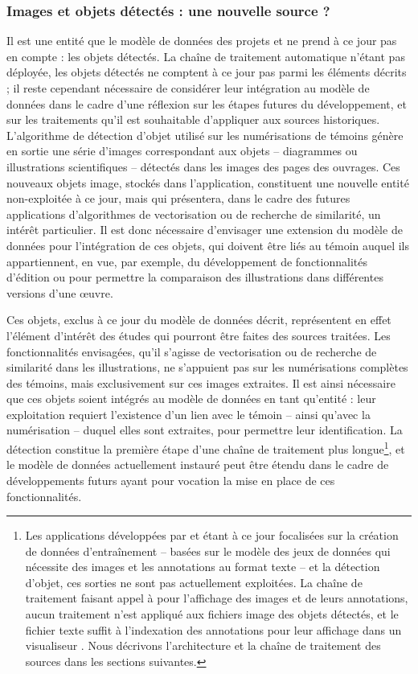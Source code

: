 	\subsubsection{Images et objets détectés : une nouvelle source ?}
	
	Il est une entité que le modèle de données des projets \vhs et \eida ne prend à ce jour pas en compte : les objets détectés. La chaîne de traitement automatique n'étant pas déployée, les objets détectés ne comptent à ce jour pas parmi les éléments décrits ; il reste cependant nécessaire de considérer leur intégration au modèle de données dans le cadre d'une réflexion sur les étapes futures du développement, et sur les traitements qu'il est souhaitable d'appliquer aux sources historiques. L'algorithme de détection d'objet utilisé sur les numérisations de témoins génère en sortie une série d'images correspondant aux objets -- diagrammes ou illustrations scientifiques -- détectés dans les images des pages des ouvrages. Ces nouveaux objets image, stockés dans l'application, constituent une nouvelle entité non-exploitée à ce jour, mais qui présentera, dans le cadre des futures applications d'algorithmes de vectorisation ou de recherche de similarité, un intérêt particulier. Il est donc nécessaire d'envisager une extension du modèle de données pour l'intégration de ces objets, qui doivent être liés au témoin auquel ils appartiennent, en vue, par exemple, du développement de fonctionnalités d'édition ou pour permettre la comparaison des illustrations dans différentes versions d'une œuvre.
	
	Ces objets, exclus à ce jour du modèle de données décrit, représentent en effet l'élément d'intérêt des études qui pourront être faites des sources traitées. Les fonctionnalités envisagées, qu'il s'agisse de vectorisation ou de recherche de similarité dans les illustrations, ne s'appuient pas sur les numérisations complètes des témoins, mais exclusivement sur ces images extraites. Il est ainsi nécessaire que ces objets soient intégrés au modèle de données en tant qu'entité : leur exploitation requiert l'existence d'un lien avec le témoin -- ainsi qu'avec la numérisation -- duquel elles sont extraites, pour permettre leur identification. La détection constitue la première étape d'une chaîne de traitement plus longue\footnote{Les applications développées par \eida et \vhs étant à ce jour focalisées sur la création de données d'entraînement -- basées sur le modèle des jeux de données \yolov qui nécessite des images et les annotations au format texte -- et la détection d'objet, ces sorties ne sont pas actuellement exploitées. La chaîne de traitement faisant appel à \iiif pour l'affichage des images et de leurs annotations, aucun traitement n'est appliqué aux fichiers image des objets détectés, et le fichier texte suffit à l'indexation des annotations pour leur affichage dans un visualiseur \iiif. Nous décrivons l'architecture et la chaîne de traitement des sources dans les sections suivantes.}, et le modèle de données actuellement instauré peut être étendu dans le cadre de développements futurs ayant pour vocation la mise en place de ces fonctionnalités.
